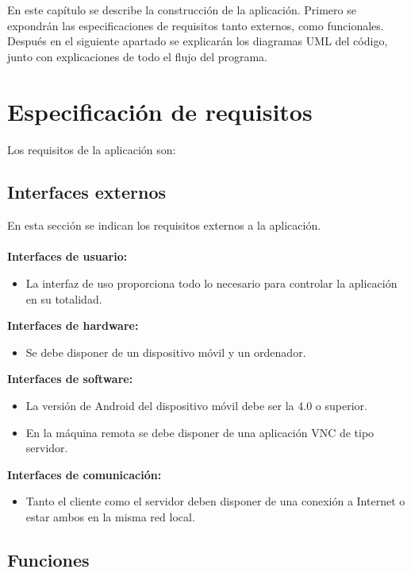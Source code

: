 En este capítulo se describe la construcción de la aplicación. Primero se expondrán las especificaciones de requisitos tanto externos, como funcionales. Después en el siguiente apartado se explicarán los diagramas UML del código, junto con explicaciones de todo el flujo del programa.

\section {Especificaci\'on de requisitos}

Los requisitos de la aplicación son:

\subsection {Interfaces externos}

En esta sección se indican los requisitos externos a la aplicación.\\ \\
\textbf{Interfaces de usuario:}
\begin{itemize}
\item La interfaz de uso proporciona todo lo necesario para controlar la aplicación en su totalidad.\\
\end{itemize}
\textbf{Interfaces de hardware:}
\begin{itemize}
\item Se debe disponer de un dispositivo móvil y un ordenador.\\
\end{itemize}
\textbf{Interfaces de software:}
\begin{itemize}
\item La versión de Android del dispositivo móvil debe ser la 4.0 o superior.
\item En la máquina remota se debe disponer de una aplicación VNC de tipo servidor.\\
\end{itemize}
\textbf{Interfaces de comunicación:}
\begin{itemize}
\item Tanto el cliente como el servidor deben disponer de una conexión a Internet o estar ambos en la misma red local.\\
\end{itemize}
\subsection {Funciones}

